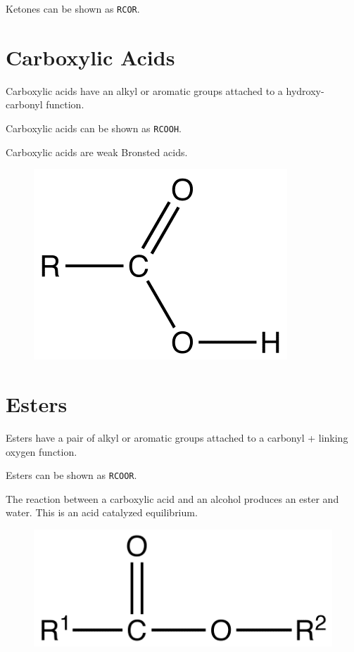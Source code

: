 \documentclass[oneside]{book} %
\theoremstyle{plain}
\begin{document}
Ketones can be shown as \texttt{RCOR}.

\section{Carboxylic Acids}
Carboxylic acids have an alkyl or aromatic groups attached to a hydroxy-carbonyl
function.

Carboxylic acids can be shown as \texttt{RCOOH}.

Carboxylic acids are weak Bronsted acids.

\begin{figure}[ht]
\includegraphics{carboxylic_acid.png}
\centering
\end{figure}

\section{Esters}
Esters have a pair of alkyl or aromatic groups attached to a carbonyl + linking
oxygen function.

Esters can be shown as \texttt{RCOOR}.

The reaction between a carboxylic acid and an alcohol produces an ester and
water.
This is an acid catalyzed equilibrium.

\begin{figure}[ht]
\includegraphics{ester.png}
\centering
\end{figure}
\end{document}
